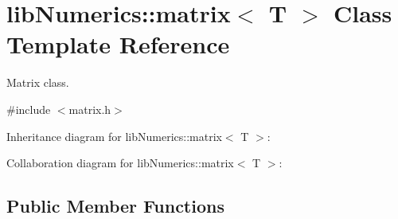 \hypertarget{classlibNumerics_1_1matrix}{}\section{lib\+Numerics\+:\+:matrix$<$ T $>$ Class Template Reference}
\label{classlibNumerics_1_1matrix}


Matrix class.  




{\ttfamily \#include $<$matrix.\+h$>$}



Inheritance diagram for lib\+Numerics\+:\+:matrix$<$ T $>$\+:


Collaboration diagram for lib\+Numerics\+:\+:matrix$<$ T $>$\+:
\subsection*{Public Member Functions}
